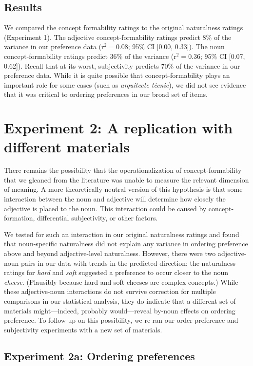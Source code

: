 \documentclass[12pt]{article}
\begin{document}
\subsection{Results}

We compared the concept formability ratings to the original naturalness ratings (Experiment 1). The adjective concept-formability ratings predict 8\% of the variance in our preference data (r$^{2}=0.08$; 95\% CI [0.00,  0.33]). The noun concept-formability ratings predict 36\% of the variance (r$^{2}=0.36$; 95\% CI [0.07,  0.62]). Recall that at its worst, subjectivity predicts 70\% of the variance in our preference data. 
While it is quite possible that concept-formability plays an important role for some cases (such as \emph{arquitecte t\`{e}cnic}), we did not see evidence that it was critical to ordering preferences in our broad set of items. 

\section{Experiment 2: A replication with different materials}

There remains the possibility that the operationalization of concept-formability that we gleaned from the literature was unable to measure the relevant dimension of meaning. A more theoretically neutral version of this hypothesis is that some interaction between the noun and adjective will determine how closely the adjective is placed to the noun. This interaction could be caused by concept-formation, differential subjectivity, or other factors. 

We tested for such an interaction in our original naturalness ratings and found that noun-specific naturalness did not explain any variance in ordering preference above and beyond adjective-level naturalness. However, there were two adjective-noun pairs in our data with trends in the predicted direction: the naturalness ratings for \emph{hard} and \emph{soft} suggested a preference to occur closer to the noun \emph{cheese}. (Plausibly because hard and soft cheeses are complex concepts.) While these adjective-noun interactions do not survive correction for multiple comparisons in our statistical analysis, they do indicate that a different set of materials might---indeed, probably would---reveal by-noun effects on ordering preference. To follow up on this possibility, we re-ran our order preference and subjectivity experiments with a new set of materials.


\subsection{Experiment 2a: Ordering preferences}
\end{document}
